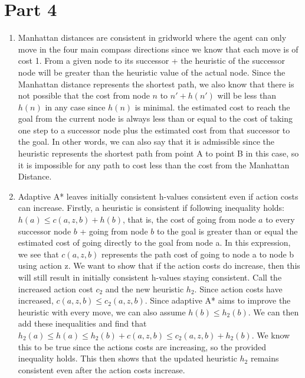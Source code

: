 \documentclass{article}
\begin{document}
\section*{Part 4} \begin{enumerate}[label=\alph*.]
 \item Manhattan distances are consistent in gridworld where the agent can only move in the four main compass directions since we know that each move is of cost 1. From a given node to its successor + the heuristic of the successor node will be greater than the heuristic value of the actual node. Since the Manhattan distance represents the shortest path, we also know that there is not possible that the cost from node $n$ to $n' + h(n')$ will be less than $h(n)$ in any case since $h(n)$ is minimal. the estimated cost to reach the goal from the current node is always less than or equal to the cost of taking one step to a successor node plus the estimated cost from that successor to the goal. In other words, we can also say that it is admissible since the heuristic represents the shortest path from point A to point B in this case, so it is impossible for any path to cost less than the cost from the Manhattan Distance. 

 \item Adaptive A* leaves initially consistent h-values consistent even if action costs can increase. Firstly, a heuristic is consistent if following inequality holds: \(h(a) \leq c(a, z, b) + h(b)\), that is, the cost of going from node $a$ to every successor node $b$ + going from node $b$ to the goal is greater than or equal the estimated cost of going directly to the goal from node a. In this expression, we see that $c(a, z, b)$ represents the path cost of going to node a to node b using action z. We want to show that if the action costs do increase, then this will still result in initially consistent h-values staying consistent. Call the increased action cost $c_2$ and the new heuristic $h_2$. Since action costs have increased, $c(a, z, b) \leq c_2(a, z, b)$. Since adaptive A* aims to improve the heuristic with every move, we can also assume $h(b) \leq h_2(b)$. We can then add these inequalities and find that \(h_2(a) \leq h(a) \leq h_2(b) + c(a, z, b) \leq c_2(a, z, b) + h_2(b)\). We know this to be true since the actions costs are increasing, so the provided inequality holds. This then shows that the updated heuristic $h_2$ remains consistent even after the action costs increase.

 \end{enumerate}
\end{document}
